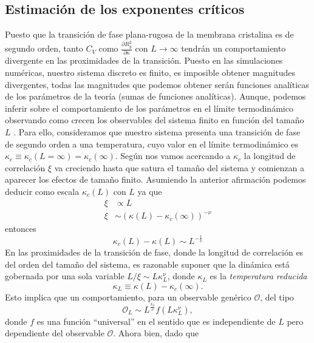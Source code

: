 \subsection{Estimación de los exponentes críticos}

Puesto que la transición de fase plana-rugosa de la membrana cristalina es de
segundo orden, tanto $C_V$ como $\frac{\partial R_g^2}{\partial \kappa}$  con
$L\rightarrow \infty$ tendrán un comportamiento divergente en las proximidades
de la transición. Puesto en las simulaciones numéricas, nuestro sistema
discreto es finito, es imposible obtener magnitudes divergentes, todas las
magnitudes que podemos obtener serán funciones analíticas de los parámetros de
la teoría (sumas de funciones analíticas). Aunque, podemos inferir sobre el
comportamiento de los parámetros en el límite termodinámico observando como
crecen los observables del sistema finito en función del tamaño $L$ \cite{Juan:tesis}. 
Para ello, consideramos que nuestro sistema presenta una transición de fase de
segundo orden a una temperatura, cuyo valor en el límite termodinámico es
$\kappa_c\!\equiv\!\kappa_c{\scriptstyle
  (L=\infty)}\!=\!\kappa_c(\infty)$. Según nos vamos acercando a $\kappa_c$ la
longitud de correlación $\xi$ va creciendo hasta que satura el tamaño del
sistema y comienzan a aparecer los efectos de tamaño finito. Asumiendo la
anterior afirmación podemos deducir como escala $\kappa_c(L)$ con $L$ ya que
\begin{align}
\xi&\propto L\\ 
\xi&\sim (\kappa(L)-\kappa_c(\infty))^{-\nu}
\end{align}
entonces
\begin{equation}
\kappa_c(L)-\kappa(L)\sim L^{-\frac{1}{\nu}}
\end{equation}
En las proximidades de la transición de fase, donde la longitud de correlación
es del orden del tamaño del sistema, es razonable suponer que la dinámica está
gobernada por una sola variable $L/\xi\sim L \kappa_L^{\nu}$, donde $\kappa_L$
es la \textit{temperatura reducida}
\begin{equation}
\kappa_L\equiv \kappa(L)-\kappa_c(\infty).
\end{equation}
Esto implica que un comportamiento, para un observable genérico $\mathcal{O}$, del tipo
\begin{equation}
\mathcal{O}_L\sim L^{\frac{x_0}{\nu}}f(L \kappa_L^{\nu}),
\end{equation}
donde $f$ es una función ``universal'' en el sentido que es independiente de
$L$ pero dependiente del observable $\mathcal{O}$. Ahora bien, dado que
